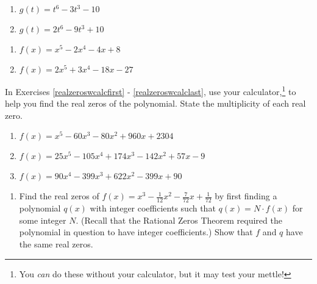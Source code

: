 \documentclass{ximera}
\begin{document}
\begin{multicols}{2}
\begin{enumerate}
\setcounter{enumi}{\value{HW}}

\item $g(t) = t^6-3t^3-10$
\item $g(t) = 2t^6-9t^3+10$

\setcounter{HW}{\value{enumi}}
\end{enumerate}
\end{multicols}

\begin{multicols}{2}
\begin{enumerate}
\setcounter{enumi}{\value{HW}}

\item $f(x) = x^5-2x^4-4x+8$
\item $f(x) = 2x^5+3x^4-18x-27$ \label{findrealzerosexerlast}

\setcounter{HW}{\value{enumi}}
\end{enumerate}
\end{multicols}

\pagebreak

In Exercises \ref{realzeroswcalcfirst} - \ref{realzeroswcalclast}, use your calculator,\footnote{You \textit{can} do these without your calculator, but it may test your mettle!} to help you find the real zeros of the polynomial.  State the multiplicity of each real zero.

\begin{enumerate}
\setcounter{enumi}{\value{HW}}

\item $f(x) = x^{5} - 60x^{3} - 80x^{2} + 960x + 2304$ \label{realzeroswcalcfirst}
\item $f(x) = 25x^{5} - 105x^{4} + 174x^{3} - 142x^{2} + 57x - 9$
\item $f(x) = 90x^{4} - 399x^{3} + 622x^{2} - 399x + 90$ \label{realzeroswcalclast}

\setcounter{HW}{\value{enumi}}
\end{enumerate}

\begin{enumerate}
\setcounter{enumi}{\value{HW}}

\item Find the real zeros of $f(x) = x^{3} - \frac{1}{12}x^{2} - \frac{7}{72}x + \frac{1}{72}$ by first finding a polynomial $q(x)$ with integer coefficients such that $q(x) = N \cdot f(x)$ for some integer $N$.  (Recall that the Rational Zeros Theorem required the polynomial in question to have integer coefficients.) Show that $f$ and $q$ have the same real zeros.

\setcounter{HW}{\value{enumi}}
\end{enumerate}
\end{document}
